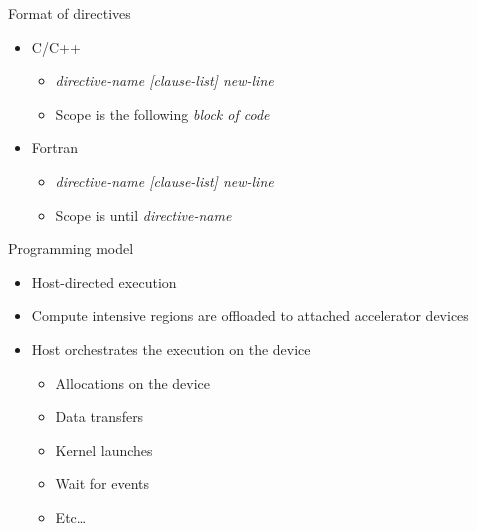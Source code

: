 \documentclass[12pt,aspectratio=169]{beamer}
\begin{document}
\begin{frame}[fragile]{Format of directives}
  \begin{itemize}
  \item C/C++
    \begin{itemize}
    \item {} \emph{directive-name [clause-list]
      new-line}
    \item Scope is the following \emph{block of code}
    \end{itemize}
  \item Fortran
    \begin{itemize}
    \item {} \emph{directive-name [clause-list]
      new-line}
    \item Scope is until  \emph{directive-name}
    \end{itemize}
  \end{itemize}
\end{frame}

\begin{frame}{Programming model}
  \begin{itemize}
  \item Host-directed execution
  \item Compute intensive regions are offloaded to attached accelerator devices
  \item Host orchestrates the execution on the device
    \begin{itemize}
    \item Allocations on the device
    \item Data transfers
    \item Kernel launches
    \item Wait for events
    \item Etc\dots
    \end{itemize}
  \end{itemize}
\end{frame}
\end{document}
